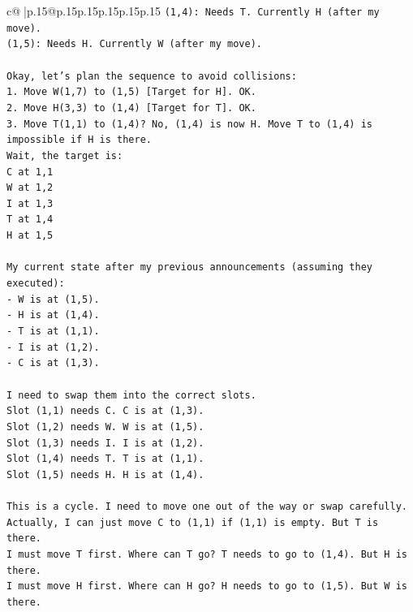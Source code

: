 \documentclass{article}
\begin{document}
{\begin{supertabular}{c@{$\;$}|p{.15\linewidth}@{}p{.15\linewidth}p{.15\linewidth}p{.15\linewidth}p{.15\linewidth}p{.15\linewidth}}
{{{\texttt{(1,4): Needs T. Currently H (after my move).} \\
\texttt{(1,5): Needs H. Currently W (after my move).} \\
\\ 
\texttt{Okay, let's plan the sequence to avoid collisions:} \\
\texttt{1. Move W(1,7) to (1,5) {[}Target for H{]}. OK.} \\
\texttt{2. Move H(3,3) to (1,4) {[}Target for T{]}. OK.} \\
\texttt{3. Move T(1,1) to (1,4)? No, (1,4) is now H. Move T to (1,4) is impossible if H is there.} \\
\texttt{Wait, the target is:} \\
\texttt{C at 1,1} \\
\texttt{W at 1,2} \\
\texttt{I at 1,3} \\
\texttt{T at 1,4} \\
\texttt{H at 1,5} \\
\\ 
\texttt{My current state after my previous announcements (assuming they executed):} \\
\texttt{{-} W is at (1,5).} \\
\texttt{{-} H is at (1,4).} \\
\texttt{{-} T is at (1,1).} \\
\texttt{{-} I is at (1,2).} \\
\texttt{{-} C is at (1,3).} \\
\\ 
\texttt{I need to swap them into the correct slots.} \\
\texttt{Slot (1,1) needs C. C is at (1,3).} \\
\texttt{Slot (1,2) needs W. W is at (1,5).} \\
\texttt{Slot (1,3) needs I. I is at (1,2).} \\
\texttt{Slot (1,4) needs T. T is at (1,1).} \\
\texttt{Slot (1,5) needs H. H is at (1,4).} \\
\\ 
\texttt{This is a cycle. I need to move one out of the way or swap carefully.} \\
\texttt{Actually, I can just move C to (1,1) if (1,1) is empty. But T is there.} \\
\texttt{I must move T first. Where can T go? T needs to go to (1,4). But H is there.} \\
\texttt{I must move H first. Where can H go? H needs to go to (1,5). But W is there.} \\
}}}
\end{supertabular}}
\end{document}
